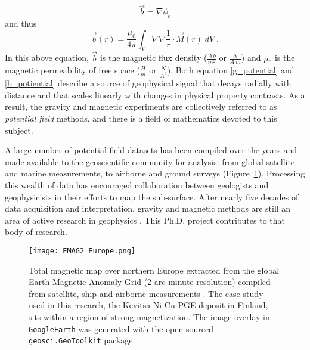 \begin{equation}
\vec{b} = \nabla \phi_b
\end{equation}
and thus
\begin{equation} \label{b_integral}
\vec{b}(r) = \frac{\mu_0}{4\pi} \int_{V} \nabla \nabla \frac{1}{r} \cdot \vec{M}(r) \; dV\;.
\end{equation}
In this above equation, $\vec{b}$ is the magnetic flux density ($\frac{Wb}{m^2}$ or $\frac{N}{A\:m}$) and $\mu_0$  is the magnetic permeability of free space ($\frac{H}{m}$ or  $\frac{N}{A^2} $).
Both equation \eqref{g_potential} and \eqref{b_potiential} describe a source of geophysical signal that decays radially with distance and that scales linearly with changes in physical property contrasts. As a result, the gravity and magnetic experiments are collectively referred to as \emph{potential field} methods, and there is a field of mathematics devoted to this subject.

A large number of potential field datasets has been compiled over the years and made available to the geoscientific community for analysis: from global satellite and marine measurements, to airborne and ground surveys (Figure~\ref{TMI_Europe}). Processing this wealth of data has encouraged collaboration between geologists and geophysicists in their efforts to map the sub-surface. After nearly five decades of data acquisition and interpretation, gravity and magnetic methods are still an area of active research in geophysics \cite[]{Nabighian2005}. This Ph.D. project contributes to that body of research.
\begin{figure}[h!]
\texttt{[image: EMAG2\_Europe.png]}
\caption{Total magnetic map over northern Europe extracted from the global Earth Magnetic Anomaly Grid (2-arc-minute resolution) compiled from satellite, ship and airborne measurements \cite[]{EMAG2017}. The case study used in this research, the Kevitsa Ni-Cu-PGE deposit in Finland, sits within a region of strong magnetization. The image overlay in \texttt{GoogleEarth} was generated with the open-sourced \texttt{geosci.GeoToolkit} package.}
\label{TMI_Europe}
\end{figure}




